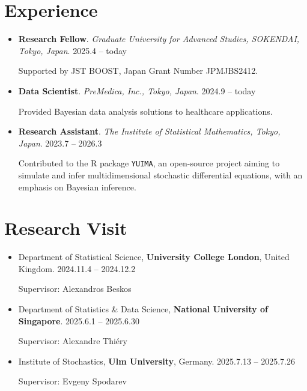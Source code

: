 \documentclass[
  11pt,
]{article}
\renewcommand{\labelitemi}{\textcolor{minty}{\faCheckCircle}} %
\begin{document}
\section{Experience}\label{experience}

\renewcommand{\labelitemi}{\textcolor{minty}{\faSuitcase}}

\begin{itemize}
\item
  \textbf{Research Fellow}. \emph{Graduate University for Advanced
  Studies, SOKENDAI, Tokyo, Japan}. \hfill {2025.4 -- today}

  Supported by JST BOOST, Japan Grant Number JPMJBS2412.
\item
  \textbf{Data Scientist}. \emph{PreMedica, Inc., Tokyo, Japan}.
  \hfill {2024.9 -- today}

  Provided Bayesian data analysis solutions to healthcare applications.
\item
  \textbf{Research Assistant}. \emph{The Institute of Statistical
  Mathematics, Tokyo, Japan}. \hfill {2023.7 -- 2026.3}

  Contributed to the R package \texttt{YUIMA}, an open-source project
  aiming to simulate and infer multidimensional stochastic differential
  equations, with an emphasis on Bayesian inference.
\end{itemize}

\section{Research Visit}\label{research-visit}

\renewcommand{\labelitemi}{\textcolor{minty}{\faUniversity}}

\begin{itemize}
\item
  Department of Statistical Science, \textbf{University College London},
  United Kingdom. \hfill {2024.11.4 -- 2024.12.2}

  Supervisor: Alexandros Beskos
\item
  Department of Statistics \& Data Science, \textbf{National University
  of Singapore}. \hfill {2025.6.1 -- 2025.6.30}

  Supervisor: Alexandre Thiéry
\item
  Institute of Stochastics, \textbf{Ulm University}, Germany.
  \hfill {2025.7.13 -- 2025.7.26}

  Supervisor: Evgeny Spodarev
\end{itemize}
\end{document}
